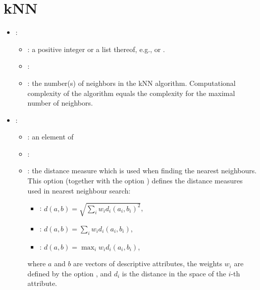 \section{kNN}


\begin{itemize}
    \item {}:
    \begin{itemize}
        \item \optionPossibleValues{}: a positive integer or a list thereof, e.g.,  or \formatOneElement{[1,5,10]}.
        \item \optionDefaultValue{}: \optionDefaultValueStyle{[1,3]}
        \item \optionDescrption{}: the number(s) of neighbors in the kNN algorithm. Computational complexity of the algorithm equals
        the complexity for the maximal number of neighbors.
    \end{itemize}
    \item {}:
    \begin{itemize}
        \item \optionPossibleValues{}: an element of 
        \item \optionDefaultValue{}: 
        \item \optionDescrption{}: the distance measure which is used when finding the nearest neighbours.        
        This option (together with the option ) defines the distance measures used in nearest neighbour search:
        \begin{itemize}
            \item {}: $d(a, b) = \sqrt{\sum_i w_i d_i(a_i, b_i)^2}$,
            \item {}: $d(a, b) = \sum_i w_i d_i(a_i, b_i)$,
            \item {}: $d(a, b) = \max_i w_i d_i(a_i, b_i)$,
        \end{itemize}
        where $a$ and $b$ are vectors of descriptive attributes, the weights $w_i$ are defined by the option ,
        and $d_i$ is the distance in the space of the $i$-th attribute.
        

\end{itemize}
\end{itemize}
